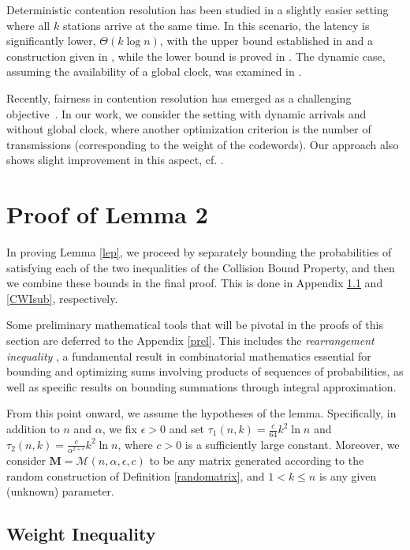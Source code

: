 \documentclass[11pt]{article}
\begin{document}
Deterministic contention resolution has been studied in a slightly easier setting where all 
$k$ stations arrive at the same time. In this scenario, the latency is significantly lower, 
$\Theta(k\log n)$, with the upper bound established in \cite{KG1985} and a construction 
given in \cite{K2005}, while the lower bound is proved in \cite{CMS2003}.
{The dynamic case, assuming the availability of a global clock, was examined in \cite{M2015}.}
 
Recently, fairness in contention resolution has emerged as a challenging objective~\cite{ChionasCKK23}. 
In our work, we consider the setting with dynamic arrivals 
{and without global clock,} where another optimization 
criterion is the number of transmissions (corresponding to the weight of the codewords). 
Our approach also shows slight improvement in this aspect, cf. \cite{M2021}.




\section{Proof of Lemma 2}\label{proofs}

In proving Lemma \ref{lep}, we proceed by separately bounding the probabilities of satisfying 
each of the two inequalities of the Collision Bound Property, and then we combine these bounds 
in the final proof. This is done in Appendix \ref{WIsub} and \ref{CWIsub}, respectively.

{Some preliminary mathematical tools that will be pivotal in the proofs of this section are
deferred to the Appendix \ref{prel}. 
This includes the \textit{rearrangement inequality} \cite{HLP1934}, a fundamental 
result in combinatorial mathematics essential for bounding and optimizing sums involving products 
of sequences of probabilities, as well as specific results on bounding summations through integral approximation.
}

From this point onward, we assume the hypotheses of the lemma. 
Specifically, in addition to $n$ and $\alpha$, we fix $\epsilon > 0$ and set 
$\tau_1(n,k) = \frac{c}{64 } k^2 \ln n$ 
and $\tau_2(n,k) = \frac{c}{\alpha^{2+\epsilon}} k^2 \ln n$, where $c > 0$ is a sufficiently 
large constant. Moreover, we consider $\mathbf{M} = \mathcal{M}(n, \alpha, \epsilon, c)$ to 
be any matrix generated according to the random construction of Definition \ref{randomatrix}, 
and $1 < k \leq n$ is any given (unknown) parameter.

\subsection{Weight Inequality}\label{WIsub}
\end{document}
